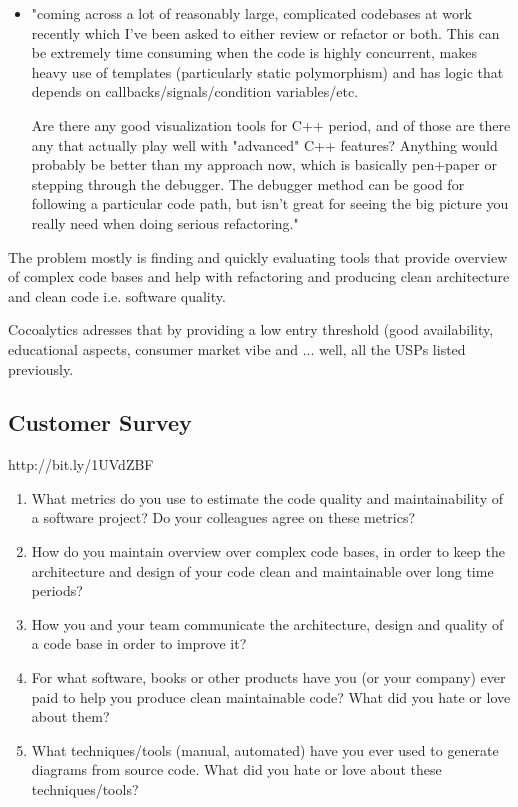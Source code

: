 \documentclass{article}
\begin{document}
\begin{itemize}
\begin{itemize}
		\item "coming across a lot of reasonably large, complicated codebases at work recently which I've been asked to either review or refactor or both. This can be extremely time consuming when the code is highly concurrent, makes heavy use of templates (particularly static polymorphism) and has logic that depends on callbacks/signals/condition variables/etc.

			Are there any good visualization tools for C++ period, and of those are there any that actually play well with "advanced" C++ features? Anything would probably be better than my approach now, which is basically pen+paper or stepping through the debugger. The debugger method can be good for following a particular code path, but isn't great for seeing the big picture you really need when doing serious refactoring."
	\end{itemize}
\end{itemize}

The problem mostly is finding and quickly evaluating tools that provide overview of complex code bases and help with refactoring and producing clean architecture and clean code i.e. software quality.

Cocoalytics adresses that by providing a low entry threshold (good availability, educational aspects, consumer market vibe and ... well, all the USPs listed previously.

\subsection{Customer Survey}

http://bit.ly/1UVdZBF

\begin{enumerate}
	\item What metrics do you use to estimate the code quality and maintainability of a software project? Do your colleagues agree on these metrics?
	\item How do you maintain overview over complex code bases, in order to keep the architecture and design of your code clean and maintainable over long time periods?
	\item How you and your team communicate the architecture, design and quality of a code base in order to improve it?
	\item For what software, books or other products have you (or your company) ever paid to help you produce clean maintainable code? What did you hate or love about them?
	\item What techniques/tools (manual, automated) have you ever used to generate diagrams from source code. What did you hate or love about these techniques/tools?
\end{enumerate}
\end{document}
